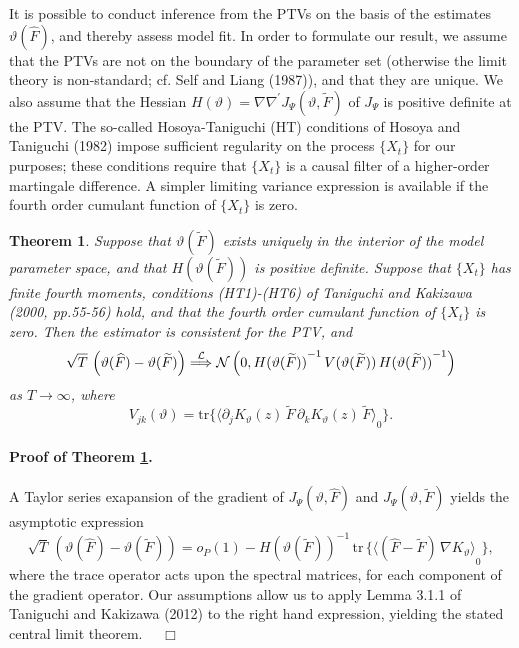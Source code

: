 \documentclass[a4paper]{book}
\def\convinlaw{\stackrel{{\cal L}}{\Longrightarrow }}
\def\tends{\rightarrow}
\newtheorem{Theorem}{Theorem}
\begin{document}

It is possible to conduct inference from the PTVs on the basis of the estimates 
$\vartheta (\widehat{F})$, and thereby assess model fit.  
 In order to formulate our result, we assume that the PTVs are not on the
 boundary of the parameter set (otherwise the limit theory
 is non-standard; cf. Self and Liang (1987)), and  that they are unique. 
We also assume that the  Hessian  $H(\vartheta) = \nabla \nabla^{\prime}
  J_{\Psi} (\vartheta, \widetilde{F}) $  of $J_{\Psi} $ is positive definite at the PTV.
  The so-called Hosoya-Taniguchi (HT) conditions of Hosoya and Taniguchi (1982) 
impose sufficient regularity   on the process
 $\{ X_t \}$ for our purposes; these conditions require that $\{ X_t \}$ is a 
causal filter of a higher-order martingale difference.  
 A simpler limiting variance expression is available if the fourth order cumulant
 function of $\{ X_t \}$ is zero.  

\begin{Theorem}
\label{thm:LPP-Clt}
 Suppose that $\vartheta (\widetilde{F}) $ exists uniquely in the interior of the model 
 parameter space,   and that $H(\vartheta (\widetilde{F}))$ is 
 positive definite.  Suppose that $\{ X_t \}$ has finite fourth moments, conditions (HT1)-(HT6) of Taniguchi and Kakizawa (2000, pp.55-56)
 hold, and that the fourth order cumulant function of $\{ X_t \}$ is zero.  Then the estimator is consistent for the PTV, and
\[
 \sqrt{T} \, \left( \vartheta( \widehat{F} ) - \vartheta (\widetilde{F}) \right) 
 \convinlaw \mathcal{N} \left( 0, { H(\vartheta (\widetilde{F})) }^{-1} \, V (\vartheta (\widetilde{F})) \, { H(\vartheta (\widetilde{F})) }^{-1} \right)
\]
 as $T \tends \infty$, where 
\[
  V_{jk} (\vartheta) =  \mbox{tr} \{ { \langle  \partial_j K_{\vartheta} (z) \, \widetilde{F} \, \partial_k K_{\vartheta} (z) \, \widetilde{F} \rangle }_0 \}.
\]
\end{Theorem}

\paragraph{Proof of Theorem \ref{thm:LPP-Clt}.}
 A Taylor series exapansion of the gradient of $J_{\Psi} (\vartheta, \widehat{F})$ and $J_{\Psi} (\vartheta, \widetilde{F})$ yields the 
 asymptotic expression
\[
  \sqrt{T} \, \left( \vartheta( \widehat{F} ) - \vartheta (\widetilde{F}) \right)  = o_P (1) 
   - { H (\vartheta( \widetilde{F} )) }^{-1} \,  \mbox{tr} \, \{  {  \langle (\widehat{F} - \widetilde{F}) \, \nabla K_{\vartheta} \rangle }_0 \},
\]
 where the trace operator acts upon the spectral matrices, for each component 
 of the gradient operator.  Our assumptions allow us to apply Lemma 3.1.1 of Taniguchi
 and Kakizawa (2012) to the right hand expression, yielding the stated central limit theorem.
 $\quad \Box$
\end{document}
